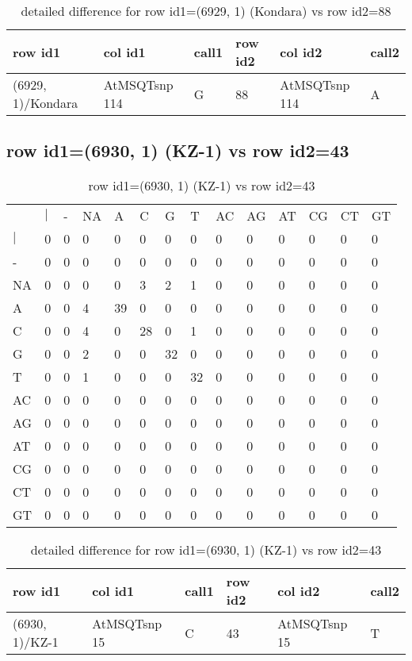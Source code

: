 \begin{center}
\begin{longtable}{|l|l|l|l|l|l|}
\caption{detailed difference for row id1=(6929, 1) (Kondara) vs row id2=88} \label{table_dm121}\\
\hline
row id1&col id1&call1&row id2&col id2&call2\\
\hline
(6929, 1)/Kondara&AtMSQTsnp 114&G&88&AtMSQTsnp 114&A\\
\hline
\end{longtable}
\end{center}

\subsection{row id1=(6930, 1) (KZ-1) vs row id2=43}
\begin{center}
\begin{longtable}{|l|l|l|l|l|l|l|l|l|l|l|l|l|l|}
\caption{row id1=(6930, 1) (KZ-1) vs row id2=43} \label{table_dm122}\\
\hline
\\
\hline
&$|$&-&NA&A&C&G&T&AC&AG&AT&CG&CT&GT\\
$|$&0&0&0&0&0&0&0&0&0&0&0&0&0\\
-&0&0&0&0&0&0&0&0&0&0&0&0&0\\
NA&0&0&0&0&3&2&1&0&0&0&0&0&0\\
A&0&0&4&39&0&0&0&0&0&0&0&0&0\\
C&0&0&4&0&28&0&1&0&0&0&0&0&0\\
G&0&0&2&0&0&32&0&0&0&0&0&0&0\\
T&0&0&1&0&0&0&32&0&0&0&0&0&0\\
AC&0&0&0&0&0&0&0&0&0&0&0&0&0\\
AG&0&0&0&0&0&0&0&0&0&0&0&0&0\\
AT&0&0&0&0&0&0&0&0&0&0&0&0&0\\
CG&0&0&0&0&0&0&0&0&0&0&0&0&0\\
CT&0&0&0&0&0&0&0&0&0&0&0&0&0\\
GT&0&0&0&0&0&0&0&0&0&0&0&0&0\\
\hline
\end{longtable}
\end{center}

\begin{center}
\begin{longtable}{|l|l|l|l|l|l|}
\caption{detailed difference for row id1=(6930, 1) (KZ-1) vs row id2=43} \label{table_dm123}\\
\hline
row id1&col id1&call1&row id2&col id2&call2\\
\hline
(6930, 1)/KZ-1&AtMSQTsnp 15&C&43&AtMSQTsnp 15&T\\
\hline
\end{longtable}
\end{center}

